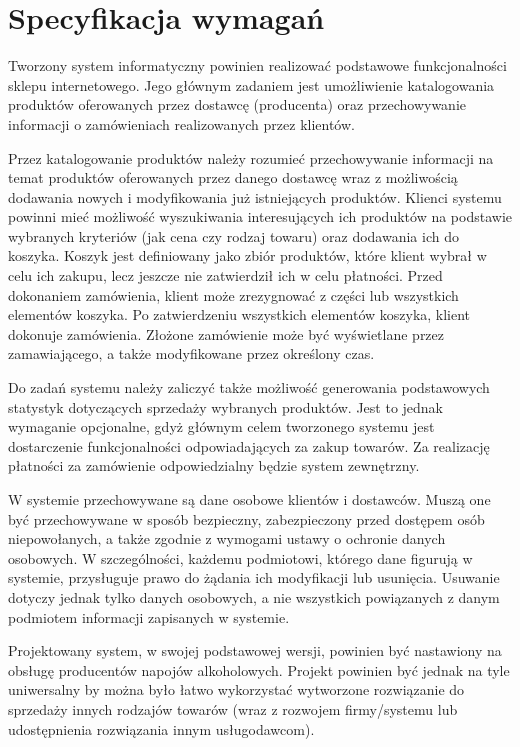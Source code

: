 \documentclass[11pt,a4paper,twoside]{article}
\begin{document}

\clearpage
{}
\setcounter{page}{3}

\section{Specyfikacja wymagań}
Tworzony system informatyczny powinien realizować podstawowe funkcjonalności sklepu internetowego. Jego głównym zadaniem jest umożliwienie katalogowania produktów oferowanych przez dostawcę (producenta) oraz przechowywanie informacji o zamówieniach realizowanych przez klientów. 

Przez katalogowanie produktów należy rozumieć przechowywanie informacji na temat produktów oferowanych przez danego dostawcę wraz z możliwością dodawania nowych i modyfikowania już istniejących produktów. Klienci systemu powinni mieć możliwość wyszukiwania interesujących ich produktów na podstawie wybranych kryteriów (jak cena czy rodzaj towaru) oraz dodawania ich do koszyka. Koszyk jest definiowany jako zbiór produktów, które klient wybrał w celu ich zakupu, lecz jeszcze nie zatwierdził ich w celu płatności. Przed dokonaniem zamówienia, klient może zrezygnować z części lub wszystkich elementów koszyka. Po zatwierdzeniu wszystkich elementów koszyka, klient dokonuje zamówienia. Złożone zamówienie może być wyświetlane przez zamawiającego, a także modyfikowane przez określony czas.

Do zadań systemu należy zaliczyć także możliwość generowania podstawowych statystyk dotyczących sprzedaży wybranych produktów. Jest to jednak wymaganie opcjonalne, gdyż głównym celem tworzonego systemu jest dostarczenie funkcjonalności odpowiadających za  zakup towarów. Za realizację płatności za zamówienie odpowiedzialny będzie system zewnętrzny.

W systemie przechowywane są dane osobowe klientów i dostawców. Muszą one być przechowywane w sposób bezpieczny, zabezpieczony przed dostępem osób niepowołanych, a także zgodnie z wymogami ustawy o ochronie danych osobowych. W szczególności, każdemu podmiotowi, którego dane figurują w systemie, przysługuje prawo do żądania ich modyfikacji lub usunięcia. Usuwanie dotyczy jednak tylko danych osobowych, a nie wszystkich powiązanych z danym podmiotem informacji zapisanych w systemie.

Projektowany system, w swojej podstawowej wersji, powinien być nastawiony na obsługę producentów napojów alkoholowych. Projekt powinien być jednak na tyle uniwersalny by można było łatwo wykorzystać wytworzone rozwiązanie do sprzedaży innych rodzajów towarów (wraz z rozwojem firmy/systemu lub udostępnienia rozwiązania innym usługodawcom).
\end{document}
